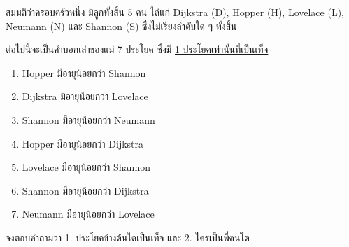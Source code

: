 \question{}

สมมติว่าครอบครัวหนึ่ง มีลูกทั้งสิ้น 5 คน ได้แก่ 
Dijkstra (D), Hopper (H), Lovelace (L), Neumann (N) และ Shannon (S) 
ซึ่งไม่เรียงลำดับใด ๆ ทั้งสิ้น

ต่อไปนี้จะเป็นคำบอกเล่าของแม่ 7 ประโยค ซึ่งมี \uline{1 ประโยคเท่านั้นที่เป็นเท็จ}

\begin{enumerate}
\item Hopper มีอายุน้อยกว่า Shannon
\item Dijkstra มีอายุน้อยกว่า Lovelace
\item Shannon มีอายุน้อยกว่า Neumann
\item Hopper มีอายุน้อยกว่า Dijkstra
\item Lovelace มีอายุน้อยกว่า Shannon
\item Shannon มีอายุน้อยกว่า Dijkstra
\item Neumann มีอายุน้อยกว่า Lovelace
\end{enumerate}

\noindent
จงตอบคำถามว่า 1. ประโยคข้างต้นใดเป็นเท็จ และ 2. ใครเป็นพี่คนโต
